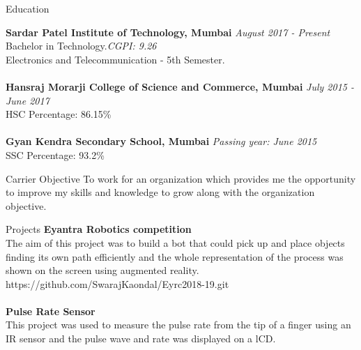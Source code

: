 \documentclass{resume} %
\begin{document}

\begin{rSection}{Education}

{\bf Sardar Patel Institute of Technology, Mumbai} \hfill {\em August 2017 - Present} 
\\ Bachelor in Technology.\hfill {\em CGPI: 9.26}
\\ Electronics and Telecommunication - 5th Semester.\\
\\{\bf Hansraj Morarji College of Science and Commerce, Mumbai} \hfill {\em July 2015 - June 2017} 
\\ HSC\hfill { Percentage: 86.15\% }
\\
\\{\bf Gyan Kendra Secondary School, Mumbai} \hfill {\em Passing year: June 2015} 
\\ SSC\hfill { Percentage: 93.2\% }


\end{rSection}

\begin{rSection}{Carrier Objective}
 To work for an organization which provides me the opportunity to improve my skills and knowledge to grow along with the organization objective.
\end{rSection}
\begin{rSection}{Projects}
{\bf Eyantra Robotics competition}
\\The aim of this project was to build a bot that could pick up and place objects finding its own path efficiently and the whole representation of the process was shown on the screen using augmented reality.\\https://github.com/SwarajKaondal/Eyrc2018-19.git\\
\\{\bf Pulse Rate Sensor}\\
This project was used to measure the pulse rate from the tip of a finger using an IR sensor and the pulse wave and rate was displayed on a lCD.\\

\end{rSection}
\end{document}
